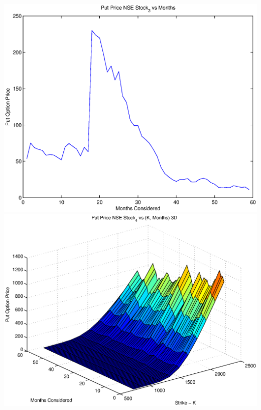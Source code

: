 \documentclass{article}
\begin{document}
\includegraphics[width=\textwidth]{Put_Price_NSE_Stock_3_vs_Months} \\

\includegraphics[width=\textwidth]{Put_Price_NSE_Stock_4_vs_(K,_Months)_3D} \\
\end{document}
